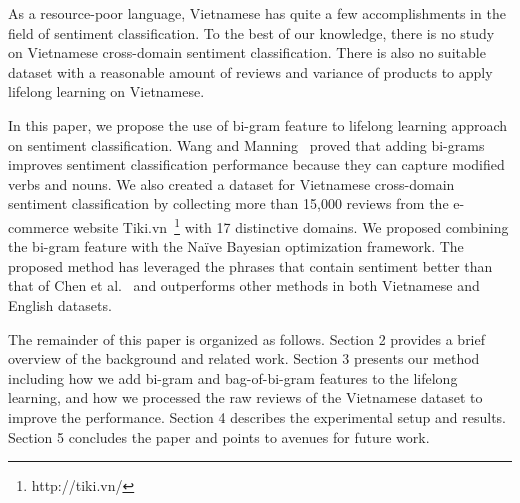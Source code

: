 As a resource-poor language, Vietnamese has quite a few accomplishments in the field of sentiment classification.
To the best of our knowledge, there is no study on Vietnamese cross-domain sentiment classification.
There is also no suitable dataset with a reasonable amount of reviews and variance of products to apply lifelong learning on Vietnamese.

In this paper, we propose the use of bi-gram feature to lifelong learning approach on sentiment classification.
Wang and Manning~\cite{wang-manning:2012:ACL2012short} proved that adding bi-grams improves sentiment classification performance because they can capture modified verbs and nouns.
We also created a dataset for Vietnamese cross-domain sentiment classification by collecting more than 15,000 reviews from the e-commerce website Tiki.vn~\footnote{http://tiki.vn/} with 17 distinctive domains.
We proposed combining the bi-gram feature with the Naïve Bayesian optimization framework.
The proposed method has leveraged the phrases that contain sentiment better than that of Chen et al.~\cite{chen-ma-liu:2015:ACL-IJCNLP} and outperforms other methods in both Vietnamese and English datasets.

The remainder of this paper is organized as follows.
Section 2 provides a brief overview of the background and related work.
Section 3 presents our method including how we add bi-gram and bag-of-bi-gram features to the lifelong learning, and how we processed the raw reviews of the Vietnamese dataset to improve the performance.
Section 4 describes the experimental setup and results.
Section 5 concludes the paper and points to avenues for future work.

